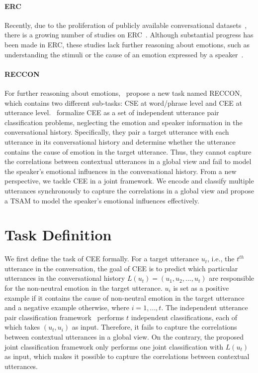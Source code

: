 \documentclass[11pt]{article}
\begin{document}
\paragraph{ERC} Recently, due to the proliferation of publicly available conversational datasets~\citep{zhou2018emotional,chen2019emotionlines,poria2019meld,chatterjee2019understanding,yuqiang2022}, there is a growing number of studies on ERC~\citep{hazarika2018icon,hazarika2018conversational,majumder2019dialoguernn,zhong2019knowledge,jiao2019higru,ghosal2020dialoguegcn,ishiwatari2020relation,ghosal2020cosmic,DBLP:conf/acl/ShenWYQ20,DBLP:conf/acl/ZhuP0ZH20,DBLP:conf/acl/HuWH20,guibon2021few,DBLP:conf/ijcai/ZhaoZL22,peng2022you}.
Although substantial progress has been made in ERC, these studies lack further reasoning about emotions, such as understanding the stimuli or the cause of an emotion expressed by a speaker~\citep{poria2021recognizing}.

\paragraph{RECCON} For further reasoning about emotions,~\citet{poria2021recognizing} propose a new task named RECCON, which contains two different sub-tasks: CSE at word/phrase level and CEE at utterance level.~\citet{poria2021recognizing} formalize CEE as a set of independent utterance pair classification problems, neglecting the emotion and speaker information in the conversational history. Specifically, they pair a target utterance with each utterance in its conversational history and determine whether the utterance contains the cause of emotion in the target utterance. Thus, they cannot capture the correlations between contextual utterances in a global view and fail to model the speaker's emotional influences in the conversational history. From a new perspective, we tackle CEE in a joint framework. We encode and classify multiple utterances synchronously to capture the correlations in a global view and propose a TSAM to model the speaker's emotional influences effectively.


\section{Task Definition}
We first define the task of CEE formally. For a target utterance $u_t$, i.e., the $t^{th}$ utterance in the conversation, the goal of CEE is to predict which particular utterances in the conversational history $L(u_t)=(u_1,u_2,...,u_t)$ are responsible for the non-neutral emotion in the target utterance. $u_i$ is set as a positive example if it contains the cause of non-neutral emotion in the target utterance and a negative example otherwise, where $i=1,...,t$.
The independent utterance pair classification framework~\citep{poria2021recognizing} performs $t$ independent classifications, each of which takes $(u_t, u_i)$ as input. Therefore, it fails to capture the correlations between contextual utterances in a global view. 
On the contrary, the proposed joint classification framework only performs one joint classification with $L(u_t)$ as input,
which makes it possible to capture the correlations between contextual utterances.
\end{document}
